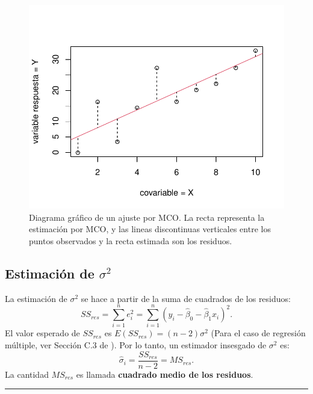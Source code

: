 \documentclass[
]{article}
\begin{document}
\begin{figure}

{\centering \includegraphics{MLGI_files/figure-latex/Figresiduos-1} 

}

\caption{Diagrama gráfico de un ajuste por MCO. La recta representa la estimación por MCO, y las lineas discontinuas verticales entre los puntos observados y la recta estimada son los residuos.}\label{fig:Figresiduos}
\end{figure}

\hypertarget{estimaciuxf3n-de-sigma2}{%
\subsection{\texorpdfstring{Estimación de \(\sigma^{2}\)}{Estimación de \textbackslash sigma\^{}\{2\}}}\label{estimaciuxf3n-de-sigma2}}

La estimación de \(\sigma^{2}\) se hace a partir de la suma de cuadrados de los residuos:
\[
SS_{res} = \sum_{i=1}^{n}e^{2}_{i} = \sum_{i=1}^{n} (y_{i}-\widehat{\beta}_{0} - \widehat{\beta}_{1}x_{i})^{2}.
\]
El valor esperado de \(SS_{res}\) es \(E(SS_{res})=(n-2)\sigma^{2}\) (Para el caso de regresión múltiple, ver Sección C.3 de \citet{montgomery_introduction_2012}). Por lo tanto, un estimador insesgado de \(\sigma^{2}\) es:
\[
\widehat{\sigma}_{i} = \frac{SS_{res}}{n-2} = MS_{res}.
\]
La cantidad \(MS_{res}\) es llamada \textbf{cuadrado medio de los residuos}.

\rule{\textwidth}{0.4pt}
\end{document}
